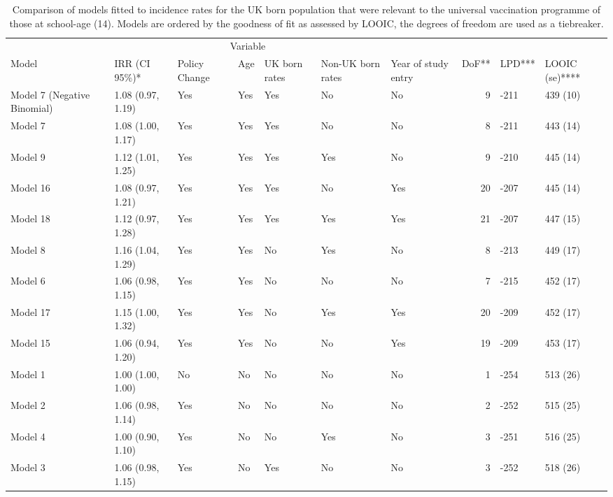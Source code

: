 \documentclass[11pt,twoside]{bristolthesis}
\begin{document}
\begin{landscape}
\begin{table}[!h]
  \caption[Comparison of models fitted to incidence rates for the UK born population that were relevant to the universal vaccination programme of those at school-age (14).]{\label{tab:07-summary-universal-ukborn}Comparison of models fitted to incidence rates for the UK born population that were relevant to the universal vaccination programme of those at school-age (14). Models are ordered by the goodness of fit as assessed by LOOIC, the degrees of freedom are used as a tiebreaker.}
  \centering
  \fontsize{8}{10}\selectfont
  \begin{tabular}{>{\raggedright\arraybackslash}p{3cm}llllllrll}
  \toprule
  \multicolumn{2}{c}{ } & \multicolumn{5}{c}{Variable} & \multicolumn{3}{c}{ } \\
  \cmidrule(l{3pt}r{3pt}){3-7}
  Model & IRR (CI 95\%)* & Policy Change & Age & UK born rates & Non-UK born rates & Year of study entry & DoF** & LPD*** & LOOIC (se)****\\
  \midrule
  Model 7 (Negative Binomial) & 1.08 (0.97, 1.19) & Yes & Yes & Yes & No & No & 9 & -211 & 439 (10)\\
  Model 7 & 1.08 (1.00, 1.17) & Yes & Yes & Yes & No & No & 8 & -211 & 443 (14)\\
  Model 9 & 1.12 (1.01, 1.25) & Yes & Yes & Yes & Yes & No & 9 & -210 & 445 (14)\\
  Model 16 & 1.08 (0.97, 1.21) & Yes & Yes & Yes & No & Yes & 20 & -207 & 445 (14)\\
  Model 18 & 1.12 (0.97, 1.28) & Yes & Yes & Yes & Yes & Yes & 21 & -207 & 447 (15)\\
  \addlinespace
  Model 8 & 1.16 (1.04, 1.29) & Yes & Yes & No & Yes & No & 8 & -213 & 449 (17)\\
  Model 6 & 1.06 (0.98, 1.15) & Yes & Yes & No & No & No & 7 & -215 & 452 (17)\\
  Model 17 & 1.15 (1.00, 1.32) & Yes & Yes & No & Yes & Yes & 20 & -209 & 452 (17)\\
  Model 15 & 1.06 (0.94, 1.20) & Yes & Yes & No & No & Yes & 19 & -209 & 453 (17)\\
  Model 1 & 1.00 (1.00, 1.00) & No & No & No & No & No & 1 & -254 & 513 (26)\\
  \addlinespace
  Model 2 & 1.06 (0.98, 1.14) & Yes & No & No & No & No & 2 & -252 & 515 (25)\\
  Model 4 & 1.00 (0.90, 1.10) & Yes & No & No & Yes & No & 3 & -251 & 516 (25)\\
  Model 3 & 1.06 (0.98, 1.15) & Yes & No & Yes & No & No & 3 & -252 & 518 (26)\\

\end{tabular}
\end{table}
\end{landscape}
\end{document}
